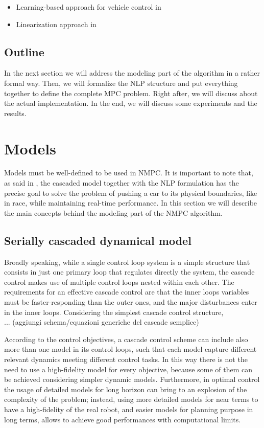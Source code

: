 \documentclass[a4paper, onecolumn, 12pt]{article}
\begin{document}

\begin{itemize}
    \item Learning-based approach for vehicle control in \cite{rosolia}
    \item Linearization approach in \cite{bemporad}
\end{itemize}


\subsection*{Outline}

In the next section we will address the modeling part of the algorithm in a
rather formal way. Then, we will formalize the NLP structure and put everything
together to define the complete MPC problem. Right after, we will discuss about
the actual implementation. In the end, we will discuss some experiments and the
results.


\newpage
\section{Models}

Models must be well-defined to be used in NMPC. It is important to note that, as
said in \cite{paper}, the cascaded model together with the NLP formulation has
the precise goal to solve the problem of pushing a car to its physical
boundaries, like in race, while maintaining real-time performance. In this
section we will describe the main concepts behind the modeling part of the NMPC
algorithm. 

\subsection{Serially cascaded dynamical model}
Broadly speaking, while a single control loop system is a simple structure that
consists in just one primary loop that regulates directly the system, the
cascade control makes use of multiple control loops nested within each other.
The requirements for an effective cascade control are that the inner loops
variables must be faster-responding than the outer ones, and the major
disturbances enter in the inner loops. Considering the simplest cascade control
structure,\\
... (aggiungi schema/equazioni generiche del cascade semplice)

According to the control objectives, a cascade control scheme can include also 
more than one model in its control loops, such that each model capture different
relevant dynamics meeting different control tasks. In this way there is not the 
need to use a high-fidelity model for every objective, because some of them can 
be achieved considering simpler dynamic models. Furthermore, in optimal control
the usage of detailed models for long horizon can bring to an explosion of the 
complexity of the problem; instead, using more detailed models for near terms 
to have a high-fidelity of the real robot, and easier models for planning purpose
in long terms, allows to achieve good performances with computational limits.
\end{document}
